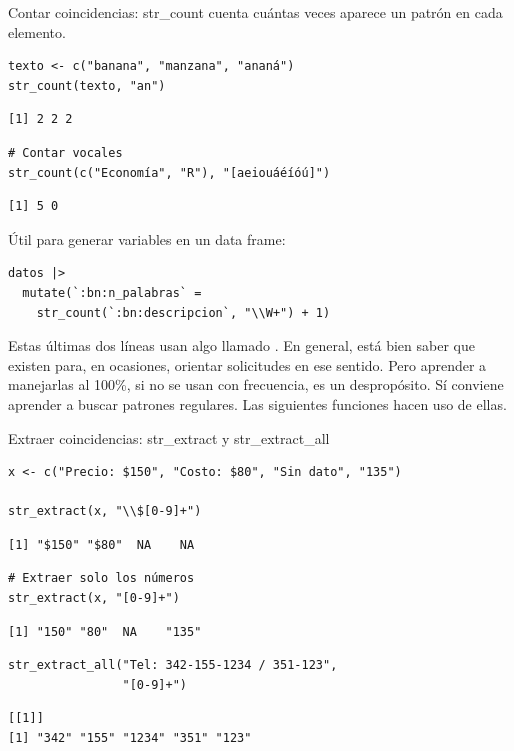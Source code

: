 \documentclass[8pt]{beamer}
\begin{document}
\begin{frame}[fragile]{Contar coincidencias: str\_count}
	 cuenta cuántas veces aparece un patrón en cada elemento.

\begin{lstlisting}[style=RScript]
texto <- c("banana", "manzana", "ananá")
str_count(texto, "an")
\end{lstlisting}
\begin{lstlisting}[style=RConsole]
[1] 2 2 2
\end{lstlisting}
\begin{lstlisting}[style=RScript]
# Contar vocales
str_count(c("Economía", "R"), "[aeiouáéíóú]")
\end{lstlisting}
\begin{lstlisting}[style=RConsole]
[1] 5 0
\end{lstlisting}

	Útil para generar variables en un data frame:
\begin{lstlisting}[style=RScript]
datos |>
  mutate(`:bn:n_palabras` =
    str_count(`:bn:descripcion`, "\\W+") + 1)
\end{lstlisting}

Estas \'ultimas dos l\'ineas usan algo llamado . En general, est\'a bien saber que existen para, en ocasiones, orientar solicitudes en ese sentido. Pero aprender a manejarlas al 100\%, si no se usan con frecuencia, es un despropósito. Sí conviene aprender a buscar patrones regulares. Las siguientes funciones hacen uso de ellas.
\end{frame}




\begin{frame}[fragile]{Extraer coincidencias: str\_extract y str\_extract\_all}
\begin{lstlisting}[style=RScript]
x <- c("Precio: $150", "Costo: $80", "Sin dato", "135")

str_extract(x, "\\$[0-9]+")
\end{lstlisting}
\begin{lstlisting}[style=RConsole]
[1] "$150" "$80"  NA    NA
\end{lstlisting}
\begin{lstlisting}[style=RScript]
# Extraer solo los números
str_extract(x, "[0-9]+")
\end{lstlisting}
\begin{lstlisting}[style=RConsole]
[1] "150" "80"  NA    "135"
\end{lstlisting}

\begin{lstlisting}[style=RScript]
str_extract_all("Tel: 342-155-1234 / 351-123",
                "[0-9]+")
\end{lstlisting}
\begin{lstlisting}[style=RConsole]
[[1]]
[1] "342" "155" "1234" "351" "123"
\end{lstlisting}
\end{frame}
\end{document}
